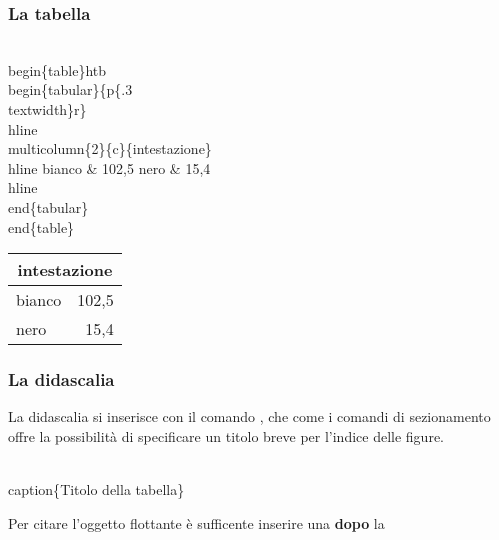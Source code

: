 \begin{frame}
  \frametitle{La tabella}
	\begin{LaTeXcode}
		\\begin\{table\}\alert{\tls htb\trs}\n
		\\begin\{tabular\}\{p\{.3\\textwidth\}r\}\
		\\hline \n
		\\multicolumn\{2\}\{c\}\{intestazione\}\bs\bs \
		\\hline \n
		\hspace*{5ex}bianco \& 102,5 \bs\bs\n
		\hspace*{5ex}nero   \& 15,4 \bs\bs\
		\\hline\n
		\\end\{tabular\}\n
		\\end\{table\}
	\end{LaTeXcode}
	\begin{LaTeXoutput}\centering
		\begin{tabular}{p{.3\textwidth}r}\hline
		\multicolumn{2}{c}{intestazione}\\\hline
		bianco & 102,5 \\
		nero   & 15,4 \\\hline
		\end{tabular}
	\end{LaTeXoutput}
\end{frame}
\begin{frame}
  \frametitle{La didascalia}
	La didascalia si inserisce con il comando \LCmd{caption}, che come i comandi di sezionamento offre la possibilit\`a di specificare un titolo breve per l'indice delle figure.
	\begin{LaTeXcode}
		\alert{\\caption\{}Titolo della tabella\alert{\}}
	\end{LaTeXcode}
  \medskip
 	 Per citare l'oggetto flottante \`e sufficente inserire una  \textbf{dopo} la \\
\end{frame}
